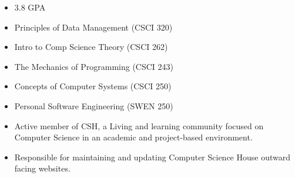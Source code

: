\begin{itemize}
    \item 3.8 GPA 
  \end{itemize}

\vspace{0.25cm}
\begin{itemize}
    \item Principles of Data Management (CSCI 320)
    \item Intro to Comp Science Theory (CSCI 262)
    \item The Mechanics of Programming (CSCI 243)
    \item Concepts of Computer Systems (CSCI 250)
    \item Personal Software Engineering (SWEN 250)
\end{itemize}

\vspace{0.25cm}

\vspace{0.25cm}

\smallskip
\newline

\vspace{0.25cm}

\begin{itemize}
    \item Active member of CSH, a Living and learning community focused on Computer Science in an academic and project-based environment.
  \end{itemize}

\begin{itemize}
  \item Responsible for maintaining and updating Computer Science House outward facing websites.
\end{itemize}